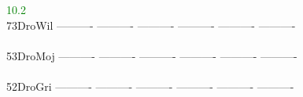 \documentclass[11pt,twoside,reqno,a4paper]{article}
\begin{document}
{\hspace*{5\charwidth}\hspace*{7\charwidth}\hspace*{1\charwidth}\hspace*{1\charwidth}\hspace*{1\charwidth}\hspace*{1\charwidth}\hspace*{44\charwidth}\textcolor{Green}{10.2}\hspace*{1\charwidth}\hspace*{1\charwidth}\\
73\hspace*{3\charwidth}DroWil	----------	----------	----------	----------	----------	----------	\\
\hspace*{5\charwidth}\hspace*{7\charwidth}\hspace*{1\charwidth}\hspace*{1\charwidth}\hspace*{1\charwidth}\hspace*{1\charwidth}\hspace*{1\charwidth}\hspace*{1\charwidth}\\
53\hspace*{3\charwidth}DroMoj	----------	----------	----------	----------	----------	----------	\\
\hspace*{5\charwidth}\hspace*{7\charwidth}\hspace*{1\charwidth}\hspace*{1\charwidth}\hspace*{1\charwidth}\hspace*{1\charwidth}\hspace*{1\charwidth}\hspace*{1\charwidth}\\
52\hspace*{3\charwidth}DroGri	----------	----------	----------	----------	----------	----------	\\
\hspace*{5\charwidth}\hspace*{7\charwidth}\hspace*{1\charwidth}\hspace*{1\charwidth}\hspace*{1\charwidth}\hspace*{1\charwidth}\hspace*{1\charwidth}\hspace*{1\charwidth}\\
}
\end{document}
